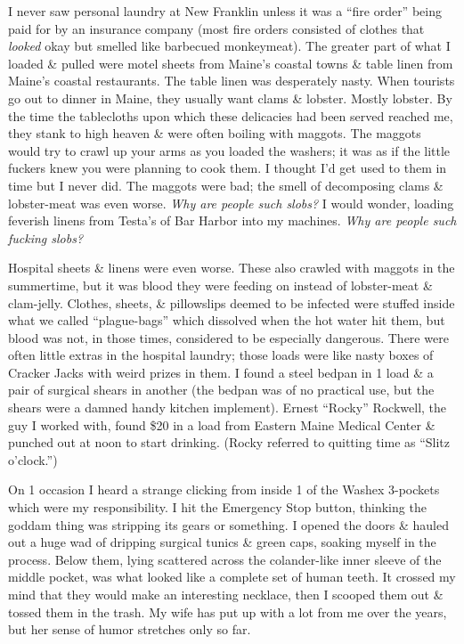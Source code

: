 \documentclass{article}
\numberwithin{equation}{section}
\begin{document}
I never saw personal laundry at New Franklin unless it was a ``fire order'' being paid for by an insurance company (most fire orders consisted of clothes that \textit{looked} okay but smelled like barbecued monkeymeat). The greater part of what I loaded \& pulled were motel sheets from Maine's coastal towns \& table linen from Maine's coastal restaurants. The table linen was desperately nasty. When tourists go out to dinner in Maine, they usually want clams \& lobster. Mostly lobster. By the time the tablecloths upon which these delicacies had been served reached me, they stank to high heaven \& were often boiling with maggots. The maggots would try to crawl up your arms as you loaded the washers; it was as if the little fuckers knew you were planning to cook them. I thought I'd get used to them in time but I never did. The maggots were bad; the smell of decomposing clams \& lobster-meat was even worse. \textit{Why are people such slobs?} I would wonder, loading feverish linens from Testa's of Bar Harbor into my machines. \textit{Why are people such fucking slobs?}

Hospital sheets \& linens were even worse. These also crawled with maggots in the summertime, but it was blood they were feeding on instead of lobster-meat \& clam-jelly. Clothes, sheets, \& pillowslips deemed to be infected were stuffed inside what we called ``plague-bags'' which dissolved when the hot water hit them, but blood was not, in those times, considered to be especially dangerous. There were often little extras in the hospital laundry; those loads were like nasty boxes of Cracker Jacks with weird prizes in them. I found a steel bedpan in 1 load \& a pair of surgical shears in another (the bedpan was of no practical use, but the shears were a damned handy kitchen implement). Ernest ``Rocky'' Rockwell, the guy I worked with, found \$20 in a load from Eastern Maine Medical Center \& punched out at noon to start drinking. (Rocky referred to quitting time as ``Slitz o'clock.'')

On 1 occasion I heard a strange clicking from inside 1 of the Washex 3-pockets which were my responsibility. I hit the Emergency Stop button, thinking the goddam thing was stripping its gears or something. I opened the doors \& hauled out a huge wad of dripping surgical tunics \& green caps, soaking myself in the process. Below them, lying scattered across the colander-like inner sleeve of the middle pocket, was what looked like a complete set of human teeth. It crossed my mind that they would make an interesting necklace, then I scooped them out \& tossed them in the trash. My wife has put up with a lot from me over the years, but her sense of humor stretches only so far.
\end{document}
